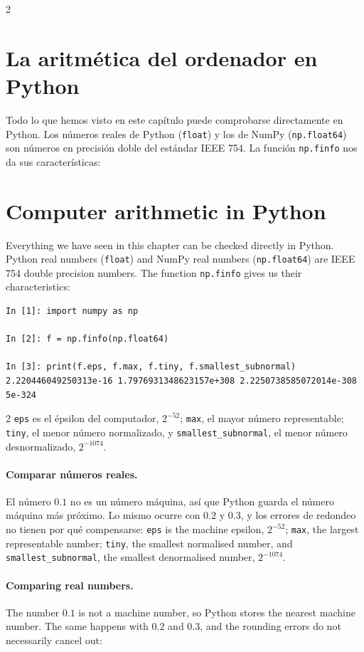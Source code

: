 \begin{paracol}{2}
\section[La aritmética del ordenador en Python]{La aritmética del ordenador en Python}\label{sec:arit_python}
Todo lo que hemos visto en este capítulo puede comprobarse directamente en Python. Los números reales de Python (\texttt{float}) y los de NumPy (\texttt{np.float64}) son números en precisión doble del estándar IEEE 754. La función \texttt{np.finfo} nos da sus características:
\switchcolumn
\section[Computer arithmetic in Python]{Computer arithmetic in Python}\label{sec:arit_python-2}
Everything we have seen in this chapter can be checked directly in Python. Python real numbers (\texttt{float}) and NumPy real numbers (\texttt{np.float64}) are IEEE 754 double precision numbers. The function \texttt{np.finfo} gives us their characteristics:
\end{paracol}
\begin{verbatim}
In [1]: import numpy as np

In [2]: f = np.finfo(np.float64)

In [3]: print(f.eps, f.max, f.tiny, f.smallest_subnormal)
2.220446049250313e-16 1.7976931348623157e+308 2.2250738585072014e-308 5e-324
\end{verbatim}
\begin{paracol}{2}
\texttt{eps} es el épsilon del computador, $2^{-52}$; \texttt{max}, el mayor número representable; \texttt{tiny}, el menor número normalizado, y \texttt{smallest\_subnormal}, el menor número desnormalizado, $2^{-1074}$.

\paragraph{Comparar números reales.} El número $0.1$ no es un número máquina, así que Python guarda el número máquina más próximo. Lo mismo ocurre con $0.2$ y $0.3$, y los errores de redondeo no tienen por qué compensarse:
\switchcolumn
\texttt{eps} is the machine epsilon, $2^{-52}$; \texttt{max}, the largest representable number; \texttt{tiny}, the smallest normalised number, and \texttt{smallest\_subnormal}, the smallest denormalised number, $2^{-1074}$.

\paragraph{Comparing real numbers.} The number $0.1$ is not a machine number, so Python stores the nearest machine number. The same happens with $0.2$ and $0.3$, and the rounding errors do not necessarily cancel out:
\end{paracol}

